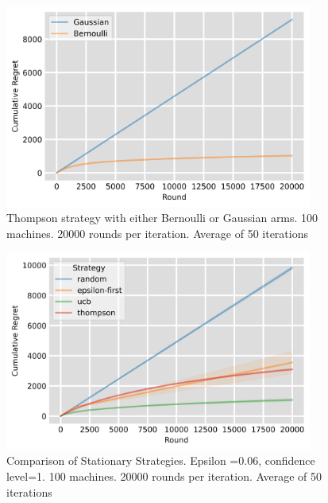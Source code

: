 \begin{figure}
    \centering
    \includegraphics[width=0.9\textwidth]{figures/thompson_plot.png}
    \caption[Thompson strategy with either Bernoulli or Gaussian arms]{Thompson strategy with either Bernoulli or Gaussian arms. 100 machines. 20000 rounds per iteration. Average of 50 iterations}
    \label{fig: thompson}
\end{figure}

\begin{figure}
    \centering
    \includegraphics[width=0.9\textwidth]{figures/plot.png}
    \caption[Comparison of Stationary Strategies]{Comparison of Stationary Strategies. Epsilon =0.06, confidence level=1. 100 machines. 20000 rounds per iteration. Average of 50 iterations}
    \label{fig: all1}
\end{figure}

